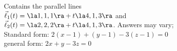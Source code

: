 {Contains the parallel lines\\
$\vec\ell_1(t) = \la 1,1,1\ra + t\la 4,1,3\ra$ and \\
$\vec\ell_2(t) = \la 2,2,2\ra + t\la 4,1,3\ra$.
}
{Answers may vary;\\
Standard form: $2(x-1)+(y-1)-3(z-1)=0$\\
general form: $2x+y-3z=0$
}

